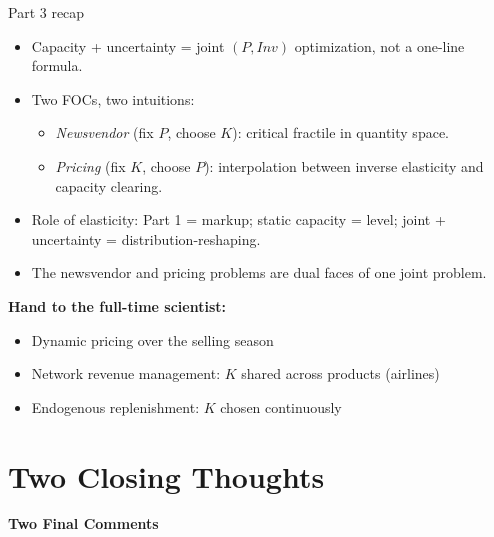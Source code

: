 \documentclass[aspectratio=169, 11pt, handout]{beamer}
\begin{document}
\begin{frame}{Part 3 recap}
\begin{itemize}
    \item Capacity + uncertainty = joint $(P, Inv)$ optimization, not a one-line formula.
    \item Two FOCs, two intuitions:
    \begin{itemize}
        \item \emph{Newsvendor} (fix $P$, choose $K$): critical fractile in quantity space.
        \item \emph{Pricing} (fix $K$, choose $P$): interpolation between inverse elasticity and capacity clearing.
    \end{itemize}
    \item Role of elasticity: Part 1 = markup; static capacity = level; joint + uncertainty = distribution-reshaping.
    \item The newsvendor and pricing problems are dual faces of one joint problem.
\end{itemize}
\vspace{0.6em}

\textbf{Hand to the full-time scientist:}
\begin{itemize}
    \item Dynamic pricing over the selling season
    \item Network revenue management: $K$ shared across products (airlines)
    \item Endogenous replenishment: $K$ chosen continuously
\end{itemize}
\end{frame}





 
\section{Two Closing Thoughts}
 
\begin{frame}
    \centering
    \vfill
    {\LARGE \textbf{Two Final Comments}}
    \vfill
\end{frame}
\end{document}
